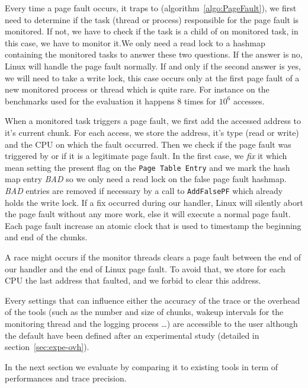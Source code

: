 Every time a page fault occurs, it traps to \Moca
(algorithm~\ref{algo:PageFault}), we first need to determine if the task
(thread or process) responsible for the page fault is
monitored. If not, we have to check if the task is a child of on monitored
task, in this case, we have to monitor it.We only need a read lock
to a hashmap containing the monitored tasks to answer these
two questions. If the answer is no, Linux will handle the page
fault normally. If and only if the second answer is yes, we will need to take
a write lock, this case occurs only at the first page fault of a new monitored
process or thread which is quite rare. For instance on the benchmarks used for
the evaluation it happens $8$ times for $10^6$ accesses.

When a monitored task triggers a page fault, we first add the accessed address
to it's current chunk. For each access, we store the address, it's type (read
or write) and the CPU on which the fault occurred.  Then we check if the page
fault was triggered by \Moca or if it is a legitimate page fault. In the first
case, we \emph{fix} it which mean setting the present flag on the \texttt{Page
Table Entry} and we mark the hash map entry \emph{BAD} so we only need a read
lock on the false page fault hashmap. \emph{BAD} entries are removed if
necessary by a call to \texttt{AddFalsePF} which already holds the write lock.
If a fix occurred during our handler, Linux will silently abort the page fault
without any more work, else it will execute a normal page fault. Each page
fault increase an atomic clock that is used to timestamp the beginning and end
of the chunks.

A race might occurs if the monitor threads clears a page fault between the
end of our handler and the end of Linux page fault. To avoid that, we store
for each CPU the last address that faulted, and we forbid to clear this
address.

Every settings that can influence either the accuracy of the trace or the
overhead of the tools (such as the number and size of chunks, wakeup intervals
for the monitoring thread and the logging process \ldots) are accessible to the
user although the default have been defined after an experimental study
(detailed in section~\ref{sec:expe-ovh}).

In the next section we evaluate \Moca by comparing it to existing tools in
term of performances and trace precision.
